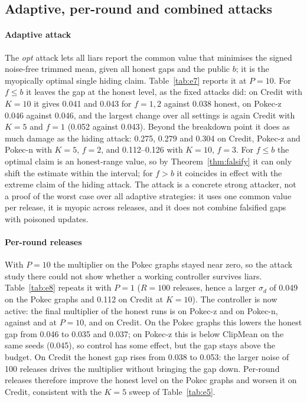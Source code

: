 \subsection{Adaptive, per-round and combined attacks}\label{sec:adaptive}




\paragraph{Adaptive attack}
The \emph{opt} attack lets all liars report the common value that minimises the signed noise-free trimmed mean, given all honest gaps and the public $b$; it is the myopically optimal single hiding claim. Table~\ref{tab:e7} reports it at $P=10$. For $f\le b$ it leaves the gap at the honest level, as the fixed attacks did: on Credit with $K=10$ it gives 0.041 and 0.043 for $f=1,2$ against 0.038 honest, on Pokec-z 0.046 against 0.046, and the largest change over all settings is again Credit with $K=5$ and $f=1$ (0.052 against 0.043). Beyond the breakdown point it does as much damage as the hiding attack: 0.275, 0.279 and 0.304 on Credit, Pokec-z and Pokec-n with $K=5$, $f=2$, and 0.112--0.126 with $K=10$, $f=3$. For $f\le b$ the optimal claim is an honest-range value, so by Theorem~\ref{thm:falsify} it can only shift the estimate within the interval; for $f>b$ it coincides in effect with the extreme claim of the hiding attack. The attack is a concrete strong attacker, not a proof of the worst case over all adaptive strategies: it uses one common value per release, it is myopic across releases, and it does not combine falsified gaps with poisoned updates.

\paragraph{Per-round releases}
With $P=10$ the multiplier on the Pokec graphs stayed near zero, so the attack study there could not show whether a working controller survives liars. Table~\ref{tab:e8} repeats it with $P=1$ ($R=100$ releases, hence a larger $\sigma_d$ of 0.049 on the Pokec graphs and 0.112 on Credit at $K=10$). The controller is now active: the final multiplier of the honest runs is \eEightPokeczLam{} on Pokec-z and \eEightPokecnLam{} on Pokec-n, against \eEightPtenPokeczLam{} and \eEightPtenPokecnLam{} at $P=10$, and \eEightCreditLam{} on Credit. On the Pokec graphs this lowers the honest gap from 0.046 to 0.035 and 0.037; on Pokec-z this is below ClipMean on the same seeds (0.045), so control has some effect, but the gap stays above the budget. On Credit the honest gap rises from 0.038 to 0.053: the larger noise of 100 releases drives the multiplier without bringing the gap down. Per-round releases therefore improve the honest level on the Pokec graphs and worsen it on Credit, consistent with the $K=5$ sweep of Table~\ref{tab:e5}.

